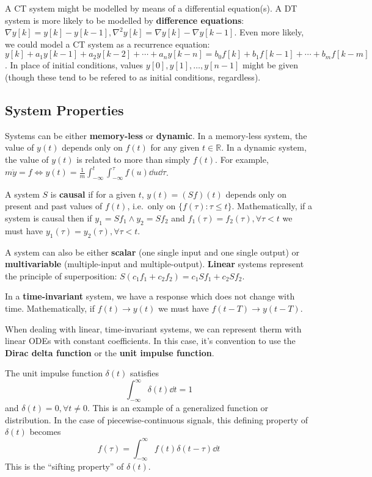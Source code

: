 \documentclass[12pt]{article}
\begin{document}
A CT system might be modelled by means of a differential equation(s). A DT system is more likely to be modelled by {\bf difference equations}: $\nabla y[k] = y[k] - y[k-1], \nabla^2 y[k] = \nabla y[k] - \nabla y[k-1]$. Even more likely, we could model a CT system as a recurrence equation: $y[k] + a_1y[k-1] + a_2y[k-2] + \cdots + a_n y[k-n] = b_0f[k] + b_1f[k-1] + \cdots + b_m f[k-m]$. In place of initial conditions, values $y[0], y[1], \dots, y[n-1]$ might be given (though these tend to be refered to as initial conditions, regardless).

\subsection{System Properties}
Systems can be either {\bf memory-less} or {\bf dynamic}. In a memory-less system, the value of $y(t)$ depends only on $f(t)$ for any given $t\in\mathbb{R}$. In a dynamic system, the value of $y(t)$ is related to more than simply $f(t)$. For example, $m \ddot y = f \iff y(t) = \frac{1}{m} \int_{-\infty}^t \int_{-\infty}^\tau f(u) \dd u \dd \tau$.

A system $S$ is {\bf causal} if for a given $t$, $y(t) = (Sf)(t)$ depends only on present and past values of $f(t)$, i.e.\ only on $\{ f(\tau) : \tau \leq t \}$. Mathematically, if a system is causal then if $y_1 = Sf_1 \land y_2 = Sf_2$ and $f_1(\tau) = f_2(\tau), \forall \tau < t$ we must have $y_1(\tau) = y_2(\tau), \forall \tau < t$.

A system can also be either {\bf scalar} (one single input and one single output) or {\bf multivariable} (multiple-input and multiple-output). {\bf Linear} systems represent the principle of superposition: $S(c_1f_1 + c_2f_2) = c_1Sf_1 + c_2Sf_2$.

In a {\bf time-invariant} system, we have a response which does not change with time. Mathematically, if $f(t) \to y(t)$ we must have $f(t-T) \to y(t-T)$.

When dealing with linear, time-invariant systems, we can represent therm with linear ODEs with constant coefficients. In this case, it's convention to use the {\bf Dirac delta function} or the {\bf unit impulse function}.

The unit impulse function $\delta(t)$ satisfies \[ \int_{-\infty}^\infty \delta(t) \dd t = 1\] and $\delta(t) = 0, \forall t \neq 0$. This is an example of a generalized function or distribution. In the case of piecewise-continuous signals, this defining property of $\delta(t)$ becomes \[ f(\tau) = \int_{-\infty}^\infty f(t) \delta(t-\tau) \dd t \] This is the ``sifting property'' of $\delta(t)$.
\end{document}
